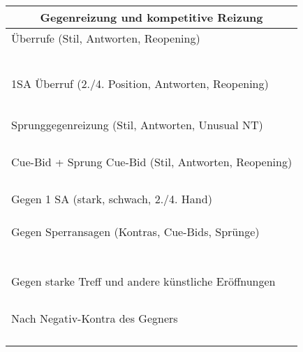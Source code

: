 \documentclass{article}
\begin{document}
\begin{multicols}{3}

\begin{tabular}{|l|}
\hline \multicolumn{1}{c}{\bf \large Gegenreizung und kompetitive Reizung} \\
\hline Überrufe (Stil, Antworten, Reopening) \\
\\
\\
\\
\\
\\
\\
\hline 1SA Überruf (2./4. Position, Antworten, Reopening) \\
\\
\\
\\
\\
\\
\hline Sprunggegenreizung (Stil, Antworten, Unusual NT) \\
\\
\\
\\
\\
\hline Cue-Bid + Sprung Cue-Bid (Stil, Antworten, Reopening) \\
\\
\\
\\
\\
\hline Gegen 1 SA (stark, schwach, 2./4. Hand) \\
\\
\\
\\
\hline Gegen Sperransagen (Kontras, Cue-Bids, Sprünge) \\
\\
\\
\\
\\
\\
\\
\\
\hline Gegen starke Treff und andere künstliche Eröffnungen \\
\\
\\
\\
\\
\hline Nach Negativ-Kontra des Gegners \\
\\
\\
\\
\\
\hline \end{tabular}


\end{multicols}
\end{document}
